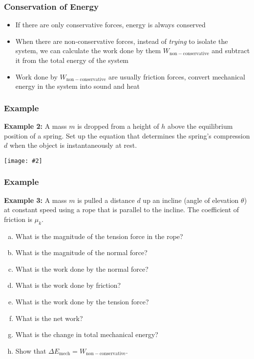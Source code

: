 \documentclass[12pt,compress,aspectratio=169]{beamer}
\newcommand{\pic}[2]{\texttt{[image: \#2]}}
\newcommand{\eq}[2]{\vspace{#1}{\Large\begin{displaymath}#2\end{displaymath}}}
\begin{document}
\begin{frame}
  \frametitle{Conservation of Energy}
  \begin{itemize}
  \item If there are only conservative forces, energy is always conserved
  \item When there are non-conservative forces, instead of \emph{trying} to
    isolate the system, we can calculate the work done by them
    $W_\mathrm{non-conservative}$ and subtract it from the total energy of the
    system
    
    \eq{-.2in}{
      \boxed{K+U+W_\mathrm{non-conservative}=K'+U'}
  }
  \item Work done by $W_\mathrm{non-conservative}$ are usually friction forces,
    convert mechanical energy in the system into sound and heat
  \end{itemize}
\end{frame}

\begin{frame}
  \frametitle{Example}
  \textbf{Example 2:} A mass $m$ is dropped from a height of $h$ above the
  equilibrium position of a spring. Set up the equation that determines the
  spring's compression $d$ when the object is instantaneously at rest.
  \begin{center}
    \pic{.35}{spring-example1.png}
  \end{center}
\end{frame}


\begin{frame}
  \frametitle{Example}
  \textbf{Example 3:} A mass $m$ is pulled a distance $d$ up an incline (angle
  of elevation $\theta$) at constant speed using a rope that is parallel to
  the incline. The coefficient of friction is $\mu_k$.
  \begin{enumerate}[(a)]
  \item What is the magnitude of the tension force in the rope?
  \item What is the magnitude of the normal force?
  \item What is the work done by the normal force?
  \item What is the work done by friction?
  \item What is the work done by the tension force?
  \item What is the net work?
  \item What is the change in total mechanical energy?
  \item Show that $\Delta E_\mathrm{mech}=W_\mathrm{non-conservative}$.
  \end{enumerate}
\end{frame}
\end{document}
